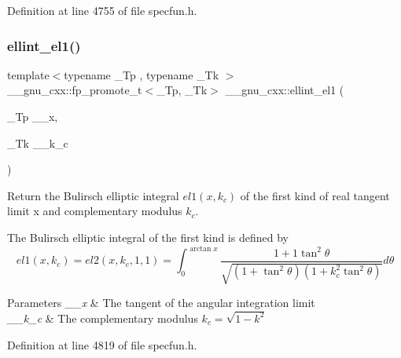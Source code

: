 Definition at line 4755 of file specfun.\+h.

\mbox{\label{group__mathsf__gnu_ga510b1e51e7d3bc937ed1b4c2f57492e4}} 
\subsubsection{\texorpdfstring{ellint\+\_\+el1()}{ellint\_el1()}}
{\footnotesize\ttfamily template$<$typename \+\_\+\+Tp , typename \+\_\+\+Tk $>$ \\
\+\_\+\+\_\+gnu\+\_\+cxx\+::fp\+\_\+promote\+\_\+t$<$\+\_\+\+Tp, \+\_\+\+Tk$>$ \+\_\+\+\_\+gnu\+\_\+cxx\+::ellint\+\_\+el1 (\begin{DoxyParamCaption}\item[{\+\_\+\+Tp}]{\+\_\+\+\_\+x,  }\item[{\+\_\+\+Tk}]{\+\_\+\+\_\+k\+\_\+c }\end{DoxyParamCaption})\hspace{0.3cm}{\ttfamily [inline]}}

Return the Bulirsch elliptic integral $ el1(x,k_c) $ of the first kind of real tangent limit {\ttfamily x} and complementary modulus $ k_c $.

The Bulirsch elliptic integral of the first kind is defined by \[ el1(x,k_c) = el2(x,k_c,1,1) = \int_0^{\arctan x} \frac{1+1\tan^2\theta} {\sqrt{(1+\tan^2\theta)(1+k_c^2\tan^2\theta)}}d\theta \]


\begin{DoxyParams}{Parameters}
{\em \+\_\+\+\_\+x} & The tangent of the angular integration limit \\
\hline
{\em \+\_\+\+\_\+k\+\_\+c} & The complementary modulus $ k_c = \sqrt{1 - k^2} $ \\
\hline
\end{DoxyParams}


Definition at line 4819 of file specfun.\+h.

\mbox{\label{group__mathsf__gnu_ga8d8342bb4f42c7fe09b5589c54d4e713}} 
